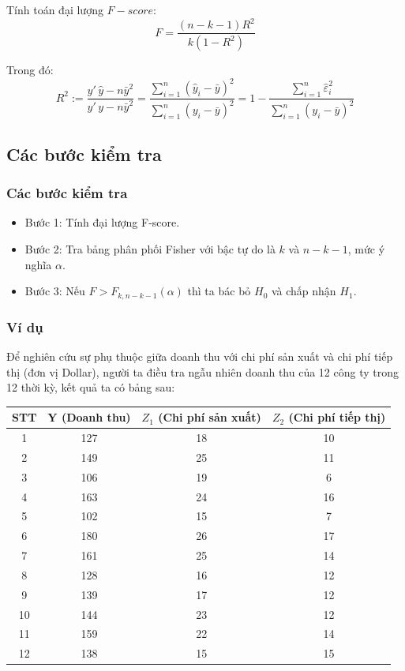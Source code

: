 \begin{footnotesize}
\begin{frame}
Tính toán đại lượng $F - score$:
\begin{equation*}
	F = \dfrac{(n-k-1)R^2}{k(1-R^2)}
\end{equation*}

Trong đó:
\[
R^{2} := 
\dfrac{\widehat{y}'\,\widehat{y} - n\bar{y}^{2}}
      {y'\,y - n\bar{y}^{2}}
= 
\dfrac{\displaystyle\sum_{i=1}^{n} (\widehat{y}_{i} - \bar{y})^{2}}
      {\displaystyle\sum_{i=1}^{n} (y_{i} - \bar{y})^{2}}
= 
1 - 
\dfrac{\displaystyle\sum_{i=1}^{n} \widehat{\varepsilon}_{i}^{2}}
      {\displaystyle\sum_{i=1}^{n} (y_{i} - \bar{y})^{2}}
\] 
\end{frame}
\subsection{Các bước kiểm tra}
\begin{frame}
\frametitle{Các bước kiểm tra}
\begin{itemize}
 \item Bước 1: Tính đại lượng F-score.
    \item Bước 2: Tra bảng phân phối Fisher với bậc tự do là $k$ và $n-k-1$, mức ý nghĩa $\alpha$.
    \item Bước 3: Nếu $F > F_{k,n-k-1}(\alpha)$ thì ta bác bỏ $H_0$ và chấp nhận $H_1$.
\end{itemize}
\end{frame}
\begin{frame}
\frametitle{Ví dụ}
 Để nghiên cứu sự phụ thuộc giữa doanh thu với chi phí sản xuất và chi phí tiếp thị (đơn vị Dollar), người ta điều
 tra ngẫu nhiên doanh thu của 12 công ty trong 12 thời kỳ, kết quả ta có bảng sau:
     {\scriptsize\begin{center}
            \begin{tabular}{|c|c|c|c|}
	\hline 
	STT & Y (Doanh thu) & $Z_1$ (Chi phí sản xuất) & $Z_2$ (Chi phí tiếp thị) \\
	\hline 
	1& 127 & 18 & 10 \\
      2&  149 & 25 & 11 \\
        3&106 & 19 &6\\
        4&163 & 24 &16\\
        5&102 & 15 &7\\
        6&180 &26 &17\\
        7&161 &25 &14\\
        8&128 &16 &12\\
        9&139 &17 &12\\
        10&144 &23 &12\\
        11&159 &22 &14\\
        12&138 &15 &15\\
	\hline
        

\end{tabular}
\end{center}}
\end{frame}
\end{footnotesize}
